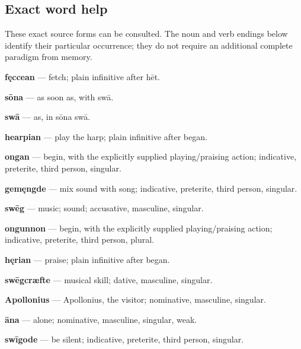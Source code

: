 \subsection*{Exact word help}

These exact source forms can be consulted. The noun and verb endings below identify their particular occurrence; they do not require an additional complete paradigm from memory.

\textbf{fęccean} — fetch; plain infinitive after hēt.

\textbf{sōna} — as soon as, with swā.

\textbf{swā} — as, in sōna swā.

\textbf{hearpian} — play the harp; plain infinitive after began.

\textbf{ongan} — begin, with the explicitly supplied playing/\allowbreak{}praising action; indicative, preterite, third person, singular.

\textbf{gemęngde} — mix sound with song; indicative, preterite, third person, singular.

\textbf{swēg} — music; sound; accusative, masculine, singular.

\textbf{ongunnon} — begin, with the explicitly supplied playing/\allowbreak{}praising action; indicative, preterite, third person, plural.

\textbf{hęrian} — praise; plain infinitive after began.

\textbf{swēgcræfte} — musical skill; dative, masculine, singular.

\textbf{Apollonius} — Apollonius, the visitor; nominative, masculine, singular.

\textbf{āna} — alone; nominative, masculine, singular, weak.

\textbf{swīgode} — be silent; indicative, preterite, third person, singular.

